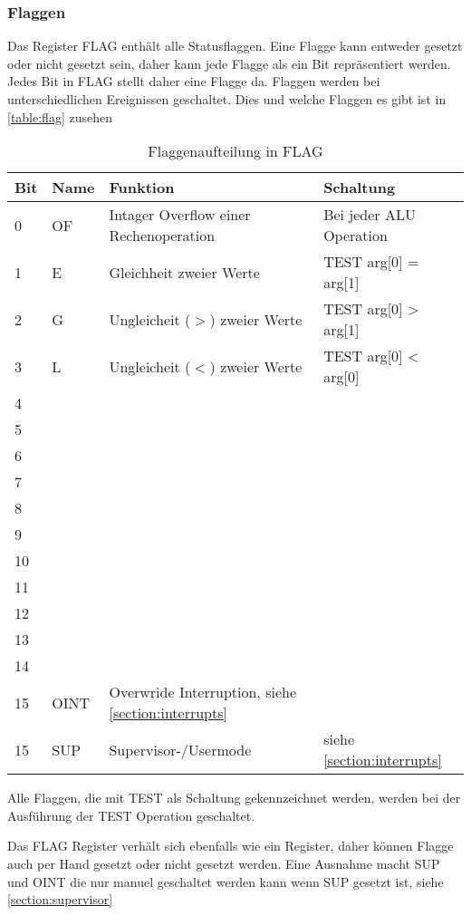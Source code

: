 \documentclass{scrartcl}
\begin{document}
\subsubsection{\label{section:flags}Flaggen}

Das Register FLAG enthält alle Statusflaggen. Eine Flagge kann entweder gesetzt oder nicht gesetzt sein, daher kann jede Flagge als ein Bit repräsentiert werden. Jedes Bit in FLAG stellt daher eine Flagge da. Flaggen werden bei unterschiedlichen Ereignissen geschaltet. Dies und welche Flaggen es gibt ist in \autoref{table:flag} zusehen

\begin{center}
	\begin{table}[h]
		\caption{\label{table:flag}Flaggenaufteilung in FLAG}
		\begin{tabular}{l | l | l | l}
			Bit & Name & Funktion & Schaltung \\
			\hline
			 0 & OF  & Intager Overflow einer Rechenoperation & Bei jeder ALU Operation\\
			 1 & E   & Gleichheit zweier Werte & TEST arg[0] = arg[1]\\
			 2 & G   & Ungleicheit ($>$) zweier Werte & TEST arg[0] > arg[1]\\
			 3 & L   & Ungleicheit ($<$) zweier Werte & TEST arg[0] < arg[0]\\
			 4 &  &  &  \\
			 5 &  &  &  \\
			 6 &  &  &  \\
			 7 &  &  &  \\
			 8 &  &  &  \\
			 9 &  &  &  \\
			10 &  &  &  \\
			11 &  &  &  \\
			12 &  &  &  \\
			13 &  &  &  \\
			14 &  &  &  \\
			15 & OINT & Overwride Interruption, siehe \autoref{section:interrupts} &  \\
			15 & SUP & Supervisor-/Usermode & siehe \autoref{section:interrupts} 
		\end{tabular}
	\end{table}
\end{center}


Alle Flaggen, die mit TEST als Schaltung gekennzeichnet werden, werden bei der Ausführung der TEST Operation geschaltet.

Das FLAG Register verhält sich ebenfalls wie ein Register, daher können Flagge auch per Hand gesetzt oder nicht gesetzt werden. Eine Ausnahme macht SUP und OINT die nur manuel geschaltet werden kann wenn SUP gesetzt ist, siehe \autoref{section:supervisor}
\end{document}
